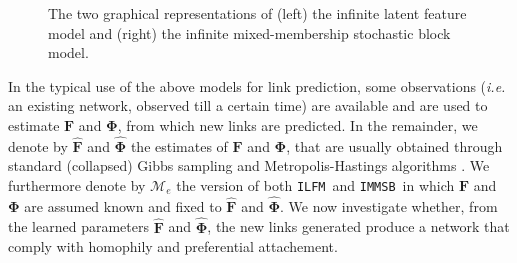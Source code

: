 \documentclass[9pt,twocolumn,twoside]{pnas-new}
\newcommand{\ifm}{\texttt{ILFM}}
\newcommand{\imb}{\texttt{IMMSB}}
\newcommand{\mat}[1]{\mathbf{#1}}
\begin{document}
\begin{figure}[t]
	\centering
	\vspace{1cm}
	\scalebox{0.77}{
	}
	\endminipage
	\scalebox{0.77}{
    }
	\endminipage
	\caption{The two graphical representations of (left) the infinite latent feature model and (right) the infinite mixed-membership stochastic block model.}
	\label{fig:ilfrm}
\end{figure}

In the typical use of the above models for link prediction, some observations (\textit{i.e.} an existing network, observed till a certain time) are available and are used to estimate $\mat{F}$ and $\mat{\Phi}$, from which new links are predicted. In the remainder, we denote by $\mat{\hat{F}}$ and $\mat{\hat{\Phi}}$ the estimates of $\mat{F}$ and $\mat{\Phi}$, that are usually obtained through standard (collapsed) Gibbs sampling and Metropolis-Hastings algorithms \cite{ILFRM,IBP,HDP,diMMSB}. We furthermore denote by $\mathcal{M}_e$ the version of both \ifm\ and \imb\ in which $\mat{F}$ and $\mat{\Phi}$ are assumed known and fixed to $\mat{\hat{F}}$ and $\mat{\hat{\Phi}}$. We now investigate whether, from the learned parameters $\mat{\hat{F}}$ and $\mat{\hat{\Phi}}$, the new links generated produce a network that comply with homophily and preferential attachement.








\end{document}
